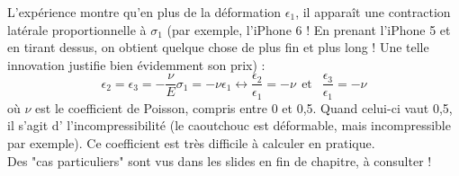     L'expérience montre qu'en plus de la déformation $\epsilon_1$, il apparaît une contraction 
    latérale proportionnelle à $\sigma_1$ (par exemple, l'iPhone 6 ! En prenant l'iPhone 5 et en
    tirant dessus, on obtient quelque chose de plus fin et plus long ! Une telle innovation 
    justifie bien évidemment son prix) :
    \begin{equation}
    \epsilon_2 = \epsilon_3 = -\frac{\nu}{E}\sigma_1 = -\nu \epsilon_1 \leftrightarrow 
    \frac{\epsilon_2}{\epsilon_1}= -\nu\ \ \text{et }\ \ \frac{\epsilon_3}{\epsilon_1} = -\nu
    \end{equation}
    où $\nu$ est le coefficient de Poisson, compris entre 0 et 0,5. Quand celui-ci vaut 0,5, il
    s'agit d' l'incompressibilité (le caoutchouc est déformable, mais incompressible par exemple).
    Ce coefficient est très difficile à calculer en pratique.\\
    
    Des "cas particuliers" sont vus dans les slides en fin de chapitre, à consulter !